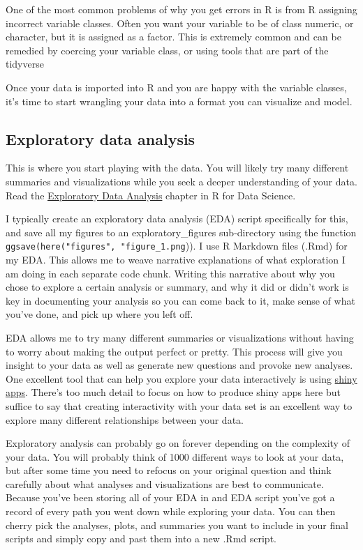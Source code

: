 \documentclass[]{book}
\begin{document}
One of the most common problems of why you get errors in R is from R
assigning incorrect variable classes. Often you want your variable to be
of class numeric, or character, but it is assigned as a factor. This is
extremely common and can be remedied by coercing your variable class, or
using tools that are part of the tidyverse

Once your data is imported into R and you are happy with the variable
classes, it's time to start wrangling your data into a format you can
visualize and model.

\subsection{Exploratory data analysis}\label{exploratory-data-analysis}

This is where you start playing with the data. You will likely try many
different summaries and visualizations while you seek a deeper
understanding of your data. Read the
\href{http://r4ds.had.co.nz/exploratory-data-analysis.html}{Exploratory
Data Analysis} chapter in R for Data Science.

I typically create an exploratory data analysis (EDA) script
specifically for this, and save all my figures to an
exploratory\_figures sub-directory using the function
\texttt{ggsave(here("figures",\ "figure\_1.png})). I use R Markdown
files (.Rmd) for my EDA. This allows me to weave narrative explanations
of what exploration I am doing in each separate code chunk. Writing this
narrative about why you chose to explore a certain analysis or summary,
and why it did or didn't work is key in documenting your analysis so you
can come back to it, make sense of what you've done, and pick up where
you left off.

EDA allows me to try many different summaries or visualizations without
having to worry about making the output perfect or pretty. This process
will give you insight to your data as well as generate new questions and
provoke new analyses. One excellent tool that can help you explore your
data interactively is using \href{https://shiny.rstudio.com/}{shiny
apps}. There's too much detail to focus on how to produce shiny apps
here but suffice to say that creating interactivity with your data set
is an excellent way to explore many different relationships between your
data.

Exploratory analysis can probably go on forever depending on the
complexity of your data. You will probably think of 1000 different ways
to look at your data, but after some time you need to refocus on your
original question and think carefully about what analyses and
visualizations are best to communicate. Because you've been storing all
of your EDA in and EDA script you've got a record of every path you went
down while exploring your data. You can then cherry pick the analyses,
plots, and summaries you want to include in your final scripts and
simply copy and past them into a new .Rmd script.
\end{document}
